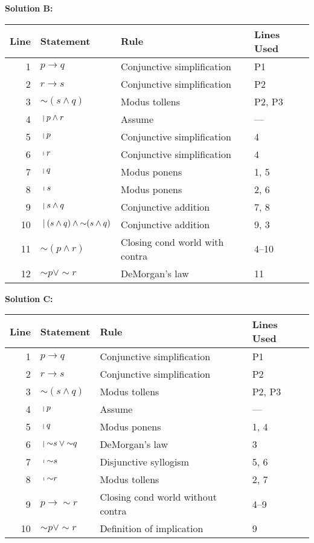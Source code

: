 \documentclass[10pt, letterpaper]{article}
\newcommand{\nott}{{\sim}}
\begin{document}
\begin{enumerate}
\textbf{Solution B:}
                
\begin{tabular}{|r|l|l|l|} \hline
Line & Statement & Rule & Lines Used \\ \hline
1 & $p \to q$ & Conjunctive simplification & P1 \\ \hline
2 & $r \to s$ & Conjunctive simplification & P2 \\ \hline
3 & $\nott (s \land q)$ & Modus tollens & P2, P3 \\ \hline
4 & $\ \vline \ p \land r $& Assume & --- \\ \hline
5 & $\ \vline \ p$ & Conjunctive simplification &4 \\ \hline
6 & $\ \vline \ r$ & Conjunctive simplification &4 \\ \hline
7 & $\ \vline \ q$ & Modus ponens & 1, 5 \\ \hline
8 & $\ \vline \ s$ & Modus ponens & 2, 6 \\ \hline
9 & $\ \vline \ s \land q$ & Conjunctive addition & 7, 8 \\ \hline
10& $\ \vline \ (s \land q) \land \nott (s \land q)$ & Conjunctive addition & 9, 3 \\ \hline
11& $\nott (p \land r)$ & Closing cond world with contra & 4--10  \\ \hline
12& $\nott p \lor \nott r$ & DeMorgan's law & 11  \\ \hline
\end{tabular}

\textbf{Solution C:}
                
\begin{tabular}{|r|l|l|l|} \hline
Line & Statement & Rule & Lines Used \\ \hline
1 & $p \to q$ & Conjunctive simplification & P1 \\ \hline
2 & $r \to s$ & Conjunctive simplification & P2 \\ \hline
3 & $\nott (s \land q)$ & Modus tollens & P2, P3 \\ \hline
4 & $\ \vline \ p  $& Assume & --- \\ \hline
5 & $\ \vline \ q$ & Modus ponens & 1, 4 \\ \hline
6 & $\ \vline \ \nott s \lor \nott q$ & DeMorgan's law & 3 \\ \hline
7 & $\ \vline \ \nott s$ & Disjunctive syllogism & 5, 6\\ \hline
8 & $\ \vline \ \nott r$ & Modus tollens & 2, 7\\ \hline
9& $p \to \nott r$ & Closing cond world without contra & 4--9  \\ \hline
10& $\nott p \lor \nott r$ & Definition of implication & 9  \\ \hline
\end{tabular}


\end{enumerate}
\end{document}
